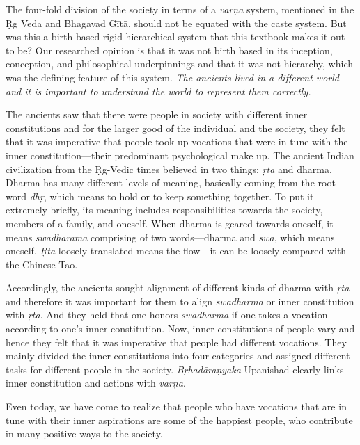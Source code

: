 The four-fold division of the society in terms of a \textit{varṇa} system, mentioned in the Ṛg Veda and Bhagavad Gītā, should not be equated with the caste system. But was this a birth-based rigid hierarchical system that this textbook makes it out to be? Our researched opinion is that it was not birth based in its inception, conception, and philosophical underpinnings and that it was not hierarchy, which was the defining feature of this system. \textit{The ancients lived in a different world and it is important to understand the world to represent them correctly.} 

The ancients saw that there were people in society with different inner constitutions and for the larger good of the individual and the society, they felt that it was imperative that people took up vocations that were in tune with the inner constitution—their predominant psychological make up. The ancient Indian civilization from the Ṛg-Vedic times believed in two things: \textit{ŗta} and dharma. Dharma has many different levels of meaning, basically coming from the root word \textit{dhŗ},  which means to hold or to keep something together. To put it extremely briefly, its meaning includes responsibilities towards the society, members of a family, and oneself. When dharma is geared towards oneself, it means \textit{swadharama} comprising of two words—dharma and \textit{swa},  which means oneself. \textit{Ŗta} loosely translated means the flow—it can be loosely compared with the Chinese Tao. 

Accordingly, the ancients sought alignment of different kinds of dharma with \textit{ŗta} and therefore it was important for them to align \textit{swadharma} or inner constitution with \textit{ŗta}. And they held that one honors \textit{swadharma} if one takes a vocation according to one’s inner constitution. Now, inner constitutions of people vary and hence they felt that it was imperative that people had different vocations. They mainly divided the inner constitutions into four categories and assigned different tasks for different people in the society. \textit{Bṛhadāraṇyaka} Upanishad clearly links inner constitution and actions with \textit{varṇa}. 

Even today, we have come to realize that people who have vocations that are in tune with their inner aspirations are some of the happiest people, who contribute in many positive ways to the society. 

